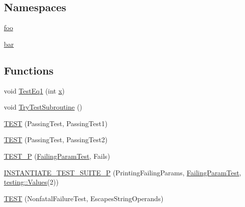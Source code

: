 \subsection*{Namespaces}
\begin{DoxyCompactItemize}
\item 
 \mbox{\hyperlink{namespacefoo}{foo}}
\item 
 \mbox{\hyperlink{namespacebar}{bar}}
\end{DoxyCompactItemize}
\subsection*{Functions}
\begin{DoxyCompactItemize}
\item 
void \mbox{\hyperlink{googletest-master_2googletest_2test_2googletest-output-test___8cc_a8f28d985b030c6dd2714d1e884c62c41}{Test\+Eq1}} (int \mbox{\hyperlink{_obj__test_2lib_2googletest-master_2googlemock_2test_2gmock-matchers__test_8cc_a6150e0515f7202e2fb518f7206ed97dc}{x}})
\item 
void \mbox{\hyperlink{googletest-master_2googletest_2test_2googletest-output-test___8cc_a14e796981ca8d3c71dbd2b839c1ce784}{Try\+Test\+Subroutine}} ()
\item 
\mbox{\hyperlink{googletest-master_2googletest_2test_2googletest-output-test___8cc_a62f1870b5f6ce5c731fe0606a944da39}{T\+E\+ST}} (Passing\+Test, Passing\+Test1)
\item 
\mbox{\hyperlink{googletest-master_2googletest_2test_2googletest-output-test___8cc_aaf792b2d65c4aeb1e2f1804e2319afd2}{T\+E\+ST}} (Passing\+Test, Passing\+Test2)
\item 
\mbox{\hyperlink{googletest-master_2googletest_2test_2googletest-output-test___8cc_a680b45844b58c5367da52c5383aea03a}{T\+E\+S\+T\+\_\+P}} (\mbox{\hyperlink{class_failing_param_test}{Failing\+Param\+Test}}, Fails)
\item 
\mbox{\hyperlink{googletest-master_2googletest_2test_2googletest-output-test___8cc_a7917783e750c5d42b4d0b6907c340c7e}{I\+N\+S\+T\+A\+N\+T\+I\+A\+T\+E\+\_\+\+T\+E\+S\+T\+\_\+\+S\+U\+I\+T\+E\+\_\+P}} (Printing\+Failing\+Params, \mbox{\hyperlink{class_failing_param_test}{Failing\+Param\+Test}}, \mbox{\hyperlink{namespacetesting_abd3c87b40c2a0663691c9b617ed5fcc2}{testing\+::\+Values}}(2))
\item 
\mbox{\hyperlink{googletest-master_2googletest_2test_2googletest-output-test___8cc_a1ae5db2b27aea7d9f321f52002d4a501}{T\+E\+ST}} (Nonfatal\+Failure\+Test, Escapes\+String\+Operands)
\item 

\end{DoxyCompactItemize}
